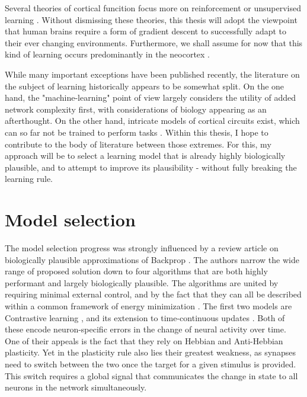 Several theories of cortical funcition focus more on reinforcement \citep{Legenstein2008} or unsupervised learning
\citep{George2009,haeusler2017}. Without dismissing these theories, this thesis will adopt the viewpoint that human
brains require a form of gradient descent to successfully adapt to their ever changing environments. Furthermore, we
shall assume for now that this kind of learning occurs predominantly in the neocortex \citep{Marblestone2016}.

While many important exceptions have been published recently, the literature on the subject of learning historically
appears to be somewhat split. On the one hand, the "machine-learning" point of view largely considers the utility of
added network complexity first, with considerations of biology appearing as an afterthought\citeme. On the other hand,
intricate models of cortical circuits exist, which can so far not be trained to perform tasks
\cite{potjans2014cell,schmidt2018multi,van2022bringing}. Within this thesis, I hope to contribute to the body of
literature between those extremes. For this, my approach will be to select a learning model that is already highly
biologically plausible, and to attempt to improve its plausibility - without fully breaking the learning rule.

\section{Model selection}

The model selection progress was strongly influenced by a review article on biologically plausible approximations of
Backprop \citep{whittington2019theories}. The authors narrow the wide range of proposed solution down to four algorithms
that are both highly performant and largely biologically plausible. The algorithms are united by requiring minimal
external control, and by the fact that they can all be described within a common framework of energy minimization
\citep{Scellier2017}. The first two models are Contrastive learning \cite{OReilly1996}, and its extension to
time-continuous updates \citep{Bengio2017}. Both of these encode neuron-specific errors in the change of neural activity
over time. One of their appeals is the fact that they rely on Hebbian and Anti-Hebbian plasticity. Yet in the plasticity
rule also lies their greatest weakness, as synapses need to switch between the two once the target for a given stimulus
is provided. This switch requires a global signal that communicates the change in state to all neurons in the network
simultaneously.

